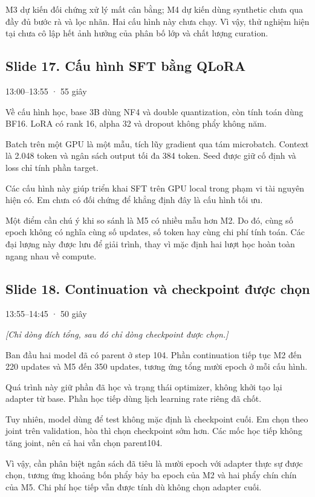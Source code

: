 \documentclass[12pt,a4paper]{article}
\begin{document}
M3 dự kiến đối chứng xử lý mất cân bằng; M4 dự kiến dùng synthetic chưa qua đầy đủ bước rà và lọc nhãn. Hai cấu hình này chưa chạy. Vì vậy, thử nghiệm hiện tại chưa cô lập hết ảnh hưởng của phân bố lớp và chất lượng curation.

\clearpage
\subsection*{Slide 17. Cấu hình SFT bằng QLoRA}
{\small\color{gray}13:00–13:55 · 55 giây}\par
Về cấu hình học, base 3B dùng NF4 và double quantization, còn tính toán dùng BF16. LoRA có rank 16, alpha 32 và dropout không phẩy không năm.

Batch trên một GPU là một mẫu, tích lũy gradient qua tám microbatch. Context là 2.048 token và ngân sách output tối đa 384 token. Seed được giữ cố định và loss chỉ tính phần target.

Các cấu hình này giúp triển khai SFT trên GPU local trong phạm vi tài nguyên hiện có. Em chưa có đối chứng để khẳng định đây là cấu hình tối ưu.

Một điểm cần chú ý khi so sánh là M5 có nhiều mẫu hơn M2. Do đó, cùng số epoch không có nghĩa cùng số updates, số token hay cùng chi phí tính toán. Các đại lượng này được lưu để giải trình, thay vì mặc định hai lượt học hoàn toàn ngang nhau về compute.

\subsection*{Slide 18. Continuation và checkpoint được chọn}
{\small\color{gray}13:55–14:45 · 50 giây}\par
{\itshape\color{gray}[Chỉ dòng đích tổng, sau đó chỉ dòng checkpoint được chọn.]}\par
Ban đầu hai model đã có parent ở step 104. Phần continuation tiếp tục M2 đến 220 updates và M5 đến 350 updates, tương ứng tổng mười epoch ở mỗi cấu hình.

Quá trình này giữ phần đã học và trạng thái optimizer, không khởi tạo lại adapter từ base. Phần học tiếp dùng lịch learning rate riêng đã chốt.

Tuy nhiên, model dùng để test không mặc định là checkpoint cuối. Em chọn theo joint trên validation, hòa thì chọn checkpoint sớm hơn. Các mốc học tiếp không tăng joint, nên cả hai vẫn chọn parent104.

Vì vậy, cần phân biệt ngân sách đã tiêu là mười epoch với adapter thực sự được chọn, tương ứng khoảng bốn phẩy bảy ba epoch của M2 và hai phẩy chín chín của M5. Chi phí học tiếp vẫn được tính dù không chọn adapter cuối.
\end{document}
